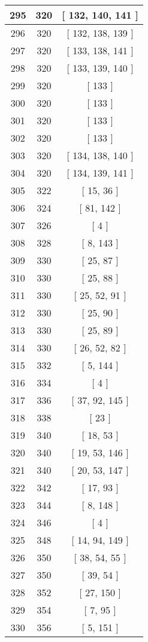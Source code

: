 \begin{center}
\begin{longtable}[H]{|| c c c ||}
295 & 320 & [ 132, 140, 141 ]
\\\hline
296 & 320 & [ 132, 138, 139 ]
\\\hline
297 & 320 & [ 133, 138, 141 ]
\\\hline
298 & 320 & [ 133, 139, 140 ]
\\\hline
299 & 320 & [ 133 ]
\\\hline
300 & 320 & [ 133 ]
\\\hline
301 & 320 & [ 133 ]
\\\hline
302 & 320 & [ 133 ]
\\\hline
303 & 320 & [ 134, 138, 140 ]
\\\hline
304 & 320 & [ 134, 139, 141 ]
\\\hline
305 & 322 & [ 15, 36 ]
\\\hline
306 & 324 & [ 81, 142 ]
\\\hline
307 & 326 & [ 4 ]
\\\hline
308 & 328 & [ 8, 143 ]
\\\hline
309 & 330 & [ 25, 87 ]
\\\hline
310 & 330 & [ 25, 88 ]
\\\hline
311 & 330 & [ 25, 52, 91 ]
\\\hline
312 & 330 & [ 25, 90 ]
\\\hline
313 & 330 & [ 25, 89 ]
\\\hline
314 & 330 & [ 26, 52, 82 ]
\\\hline
315 & 332 & [ 5, 144 ]
\\\hline
316 & 334 & [ 4 ]
\\\hline
317 & 336 & [ 37, 92, 145 ]
\\\hline
318 & 338 & [ 23 ]
\\\hline
319 & 340 & [ 18, 53 ]
\\\hline
320 & 340 & [ 19, 53, 146 ]
\\\hline
321 & 340 & [ 20, 53, 147 ]
\\\hline
322 & 342 & [ 17, 93 ]
\\\hline
323 & 344 & [ 8, 148 ]
\\\hline
324 & 346 & [ 4 ]
\\\hline
325 & 348 & [ 14, 94, 149 ]
\\\hline
326 & 350 & [ 38, 54, 55 ]
\\\hline
327 & 350 & [ 39, 54 ]
\\\hline
328 & 352 & [ 27, 150 ]
\\\hline
329 & 354 & [ 7, 95 ]
\\\hline
330 & 356 & [ 5, 151 ]
\\\hline

\end{longtable}
\end{center}
